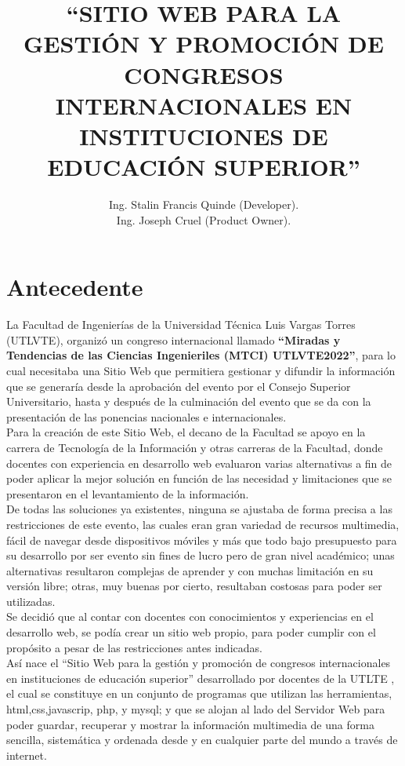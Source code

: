 \documentclass[a4paper,14px]{article}
\title{``SITIO WEB PARA LA GESTIÓN Y PROMOCIÓN DE CONGRESOS INTERNACIONALES EN INSTITUCIONES DE EDUCACIÓN SUPERIOR''}
\author{Ing. Stalin Francis Quinde (Developer).\\ Ing. Joseph Cruel (Product Owner). \\ }
\begin{document}
\maketitle

\section{Antecedente}
\label{sec:antecedente}
La Facultad de Ingenierías de la Universidad Técnica Luis Vargas Torres (UTLVTE), organizó un congreso internacional llamado \textbf{``Miradas y Tendencias de las Ciencias Ingenieriles (MTCI) UTLVTE2022''}, para lo cual necesitaba una Sitio Web que  permitiera gestionar y difundir la información que  se generaría desde la aprobación del evento por el Consejo Superior Universitario, hasta y después de  la culminación del evento que se da con la presentación de las ponencias nacionales e internacionales.\\

Para la creación de este Sitio Web, el decano de la Facultad se apoyo en la carrera de Tecnología de la Información y otras carreras de la Facultad, donde docentes con experiencia en desarrollo web evaluaron varias alternativas a fin de poder aplicar la mejor solución en función de las necesidad y limitaciones que se presentaron en el levantamiento de la información.\\

De todas las soluciones ya existentes, ninguna se ajustaba de forma precisa a las restricciones de este evento, las cuales eran  gran variedad de recursos multimedia, fácil de navegar desde dispositivos móviles y  más que todo bajo presupuesto para su desarrollo por ser evento sin fines de lucro pero de gran nivel académico; unas alternativas resultaron complejas de aprender y con muchas limitación en su versión libre; otras, muy buenas por cierto, resultaban costosas para poder ser utilizadas.\\

Se decidió que al contar con docentes con conocimientos y experiencias en el desarrollo web,  se podía crear un  sitio web propio, para poder  cumplir con el propósito a pesar de las restricciones antes indicadas.\\

Así nace el  ``Sitio Web para la gestión y promoción de congresos internacionales en instituciones de educación superior'' desarrollado por docentes de la UTLTE , el cual se constituye en un  conjunto de programas que utilizan las  herramientas,  html,css,javascrip, php, y mysql; y que se alojan al lado del Servidor Web para poder guardar, recuperar y mostrar la información multimedia de una forma sencilla, sistemática y ordenada desde y en cualquier parte del mundo a través de internet.\\
\end{document}
